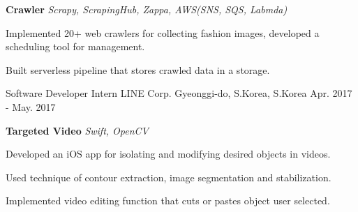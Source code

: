 \begin{cventries}
{\begin{cvitems}
        \item[]
        \item[] {\textbf{Crawler} \hspace{1cm} \textit{Scrapy, ScrapingHub, Zappa, AWS(SNS, SQS, Labmda)}}
        \item {Implemented 20+ web crawlers for collecting fashion images, developed a scheduling tool for management.} 
        \item {Built serverless pipeline that stores crawled data in a storage.}
        \item[]
      \end{cvitems}
    }


  \cventry
    {Software Developer Intern} %
    {LINE Corp.} %
    {Gyeonggi-do, S.Korea, S.Korea} %
    {Apr. 2017 - May. 2017} %
    {
      \begin{cvitems} %
        \item[] {\textbf{Targeted Video} \hspace{1cm} \textit{Swift, OpenCV}}
        \item[] {Developed an iOS app for isolating and modifying desired objects in videos.}
        \item {Used technique of contour extraction, image segmentation and stabilization.}
        \item {Implemented video editing function that cuts or pastes object user selected.}
      \end{cvitems}
    }


\end{cventries}
